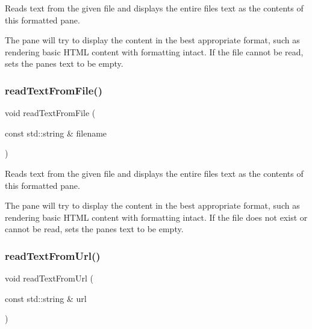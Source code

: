 Reads text from the given file and displays the entire file\textquotesingle{}s text as the contents of this formatted pane. 

The pane will try to display the content in the best appropriate format, such as rendering basic H\+T\+ML content with formatting intact. If the file cannot be read, sets the pane\textquotesingle{}s text to be empty. \mbox{\label{classGBrowserPane_a58c4154aa0c23bc980d45bf9de7cc95c}} 
\subsubsection{\texorpdfstring{read\+Text\+From\+File()}{readTextFromFile()}\hspace{0.1cm}{\footnotesize\ttfamily [2/2]}}
{\footnotesize\ttfamily void read\+Text\+From\+File (\begin{DoxyParamCaption}\item[{const std\+::string \&}]{filename }\end{DoxyParamCaption})\hspace{0.3cm}{\ttfamily [virtual]}}



Reads text from the given file and displays the entire file\textquotesingle{}s text as the contents of this formatted pane. 

The pane will try to display the content in the best appropriate format, such as rendering basic H\+T\+ML content with formatting intact. If the file does not exist or cannot be read, sets the pane\textquotesingle{}s text to be empty. \mbox{\label{classGBrowserPane_a68ff415e722130964bc9e1de826f4869}} 
\subsubsection{\texorpdfstring{read\+Text\+From\+Url()}{readTextFromUrl()}}
{\footnotesize\ttfamily void read\+Text\+From\+Url (\begin{DoxyParamCaption}\item[{const std\+::string \&}]{url }\end{DoxyParamCaption})\hspace{0.3cm}{\ttfamily [virtual]}}




